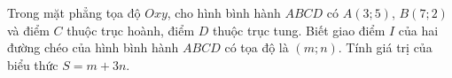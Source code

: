 \begin{ex}%
Trong mặt phẳng tọa độ $Oxy$, cho hình bình hành $ABCD$ có $A(3;5)$, $B(7;2)$ và điểm $C$ thuộc trục hoành, điểm $D$ thuộc trục tung. Biết giao điểm $I$ của hai đường chéo của hình bình hành $ABCD$ có tọa độ là $(m; n)$. Tính giá trị của biểu thức $S=m+3n$.
\end{ex}

